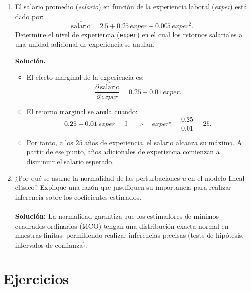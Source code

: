 \documentclass[10pt,a4paper]{article}
\begin{document}
\begin{enumerate}
\item El salario promedio (\emph{salario}) en función de la experiencia laboral
        (\emph{exper}) está dado por:
        \[
          \widehat{\text{salario}}
          = 2.5 + 0.25\,exper - 0.005\,exper^2 .
        \]
        Determine el nivel de experiencia (\texttt{exper}) en el cual los
                retornos salariales a una unidad adicional de experiencia
                se anulan.
 \\
  {\color{blue} \textbf{Solución.}
        \begin{itemize}
          \item El efecto marginal de la experiencia es:
                \[
                  \frac{\partial\,\widehat{\text{salario}}}{\partial\,exper}
                  = 0.25 - 0.01\,exper.
                \]
          \item El retorno marginal se anula cuando:
                \[
                  0.25 - 0.01\,exper = 0
                  \quad\Rightarrow\quad
                  exper^\star = \frac{0.25}{0.01} = 25.
                \]
          \item Por tanto, a los \(25\) años de experiencia,
                el salario alcanza su máximo.
                A partir de ese punto, años adicionales de experiencia
                comienzan a disminuir el salario esperado.
        \end{itemize}}

\item ¿Por qué se asume la normalidad de las perturbaciones \(u\)
        en el modelo lineal clásico? Explique una razón   que justifiquen su importancia para realizar inferencia
        sobre los coeficientes estimados.
        \\
\\
{\color{blue} \textbf{Solución:} La normalidad garantiza que los estimadores de mínimos
                cuadrados ordinarios (MCO) tengan una distribución exacta
                normal en muestras finitas, permitiendo realizar inferencias
                precisas (tests de hipótesis, intervalos de confianza).}


\end{enumerate}

\section{Ejercicios}
\end{document}
